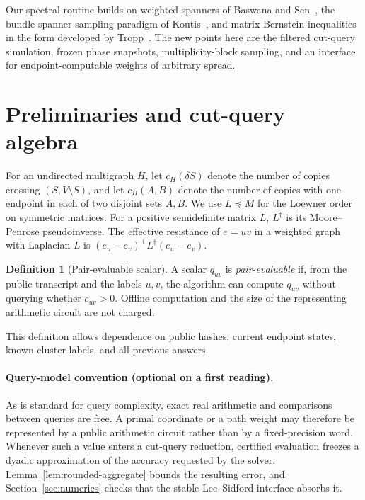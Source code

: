 \documentclass[11pt]{article}
\theoremstyle{definition}
\newtheorem{definition}[theorem]{Definition}
\newcommand{\cH}{c_H}
\begin{document}
Our spectral routine builds on weighted spanners of Baswana and
Sen~\cite{BaswanaSen2007}, the bundle-spanner sampling paradigm of
Koutis~\cite{Koutis2014}, and matrix Bernstein inequalities in the form
developed by Tropp~\cite{Tropp2012}.  The new points here are the filtered
cut-query simulation, frozen phase snapshots, multiplicity-block sampling,
and an interface for endpoint-computable weights of arbitrary spread.

\section{Preliminaries and cut-query algebra}\label{sec:prelim}

For an undirected multigraph $H$, let $\cH(\delta S)$ denote the number of
copies crossing $(S,V\setminus S)$, and let $\cH(A,B)$ denote the number of
copies with one endpoint in each of two disjoint sets $A,B$.  We use
$L\preceq M$ for the Loewner order on symmetric matrices.  For a positive
semidefinite matrix $L$, $L^\dagger$ is its Moore--Penrose pseudoinverse.
The effective resistance of $e=uv$ in a weighted graph with Laplacian $L$ is
$(e_u-e_v)^\top L^\dagger(e_u-e_v)$.

\begin{definition}[Pair-evaluable scalar]
A scalar $q_{uv}$ is \emph{pair-evaluable} if, from the public transcript and
the labels $u,v$, the algorithm can compute $q_{uv}$ without querying whether
$c_{uv}>0$.  Offline computation and the size of the representing arithmetic
circuit are not charged.
\end{definition}

This definition allows dependence on public hashes, current endpoint states,
known cluster labels, and all previous answers.

\paragraph{Query-model convention (optional on a first reading).}
As is standard for query complexity, exact real arithmetic and comparisons
between queries are free.  A primal coordinate or a path weight may therefore
be represented by a public arithmetic circuit rather than by a fixed-precision
word.  Whenever such a value enters a cut-query reduction, certified
evaluation freezes a dyadic approximation of the accuracy requested by the
solver.  Lemma~\ref{lem:rounded-aggregate} bounds the resulting error, and
Section~\ref{sec:numerics} checks that the stable Lee--Sidford interface
absorbs it.
\end{document}

